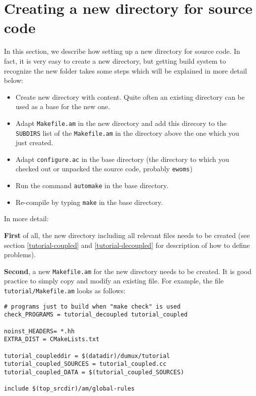 \chapter{Creating a new directory for source code}

In this section, we describe how setting up a new directory for source
code. In fact, it is very easy to create a new directory, but getting
\Dune build system to recognize the new folder takes some steps which
will be explained in more detail below:

\begin{itemize}
\item Create new directory with content. Quite often an existing
  directory can be used as a base for the new one.
\item Adapt \texttt{Makefile.am} in the new directory and add this
  direcory to the \texttt{SUBDIRS} list of the \texttt{Makefile.am} in
  the directory above the one which you just created.
\item Adapt \texttt{configure.ac} in the \eWoms base directory (the
  directory to which you checked out or unpacked the \eWoms source
  code, probably \texttt{ewoms})
\item Run the command \texttt{automake} in the \eWoms base directory.
\item Re-compile \eWoms by typing \texttt{make} in the \eWoms base
  directory.
\end{itemize}

\noindent In more detail:

\textbf{First} of all, the new directory including all relevant files
needs to be created (see section \ref{tutorial-coupled} and
\ref{tutorial-decoupled} for description of how to define problems).

\textbf{Second}, a new \texttt{Makefile.am} for the new directory
needs to be created. It is good practice to simply copy and modify an
existing file. For example, the file \texttt{tutorial/Makefile.am}
looks as follows:
\begin{verbatim}
# programs just to build when "make check" is used
check_PROGRAMS = tutorial_decoupled tutorial_coupled

noinst_HEADERS= *.hh
EXTRA_DIST = CMakeLists.txt

tutorial_coupleddir = $(datadir)/dumux/tutorial
tutorial_coupled_SOURCES = tutorial_coupled.cc
tutorial_coupled_DATA = $(tutorial_coupled_SOURCES)

include $(top_srcdir)/am/global-rules
\end{verbatim}

